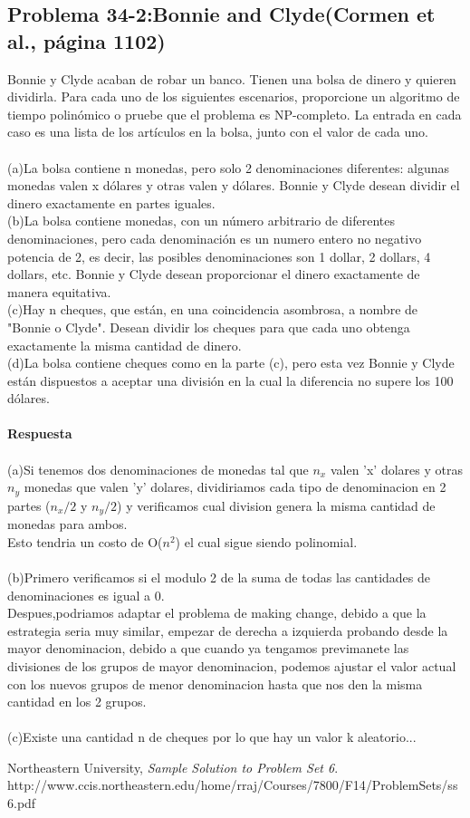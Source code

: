 \documentclass[a4paper,12pt]{article}
\begin{document}
\subsection{Problema 34-2:Bonnie and Clyde(Cormen et al., página 1102)}
Bonnie y Clyde acaban de robar un banco. Tienen una bolsa de dinero y quieren dividirla. Para cada uno de los siguientes escenarios, proporcione un algoritmo de tiempo polinómico o pruebe que el problema es NP-completo. La entrada en cada caso es una lista de los artículos en la bolsa, junto con el valor de cada uno.\\\\
(a)La bolsa contiene n monedas, pero solo 2 denominaciones diferentes: algunas monedas valen x dólares y otras valen y dólares. Bonnie y Clyde desean dividir el dinero exactamente en partes iguales.\\
(b)La bolsa contiene monedas, con un número arbitrario de diferentes denominaciones, pero cada denominación es un numero entero no negativo potencia de 2, es decir, las posibles denominaciones son 1 dollar, 2 dollars, 4 dollars, etc. Bonnie y Clyde desean proporcionar el dinero exactamente de manera equitativa.\\
(c)Hay n cheques, que están, en una coincidencia asombrosa, a nombre de "Bonnie o Clyde". Desean dividir los cheques para que cada uno obtenga exactamente la misma cantidad de dinero.\\
(d)La bolsa contiene cheques como en la parte (c), pero esta vez Bonnie y Clyde están dispuestos a aceptar una división en la cual la diferencia no supere los 100 dólares.\\\\
\textbf{Respuesta}\\\\
(a)Si tenemos dos denominaciones de monedas tal que $n_x$ valen 'x' dolares y otras $n_y$ monedas que valen 'y' dolares, dividiriamos cada tipo de denominacion en 2 partes ($n_x/2$ y $n_y/2$) y verificamos cual division genera la misma cantidad de monedas para ambos.\\
Esto tendria un costo de O($n^2$) el cual sigue siendo polinomial.
\cite{1}\\\\
(b)Primero verificamos si el modulo 2 de la suma de todas las cantidades de denominaciones es igual a 0.\\
Despues,podriamos adaptar el problema de making change, debido a que la estrategia seria muy similar, empezar de derecha a izquierda probando desde la mayor denominacion, debido a que cuando ya tengamos previmanete las divisiones de los grupos de mayor denominacion, podemos ajustar el valor actual con los nuevos grupos de menor denominacion hasta que nos den la misma cantidad en los 2 grupos.\\\\
(c)Existe una cantidad n de cheques por lo que hay un valor k aleatorio...

\begin{thebibliography}{15}

  Northeastern University,
  \emph{Sample Solution to Problem Set 6}.\\
  http://www.ccis.northeastern.edu/home/rraj/Courses/7800/F14/ProblemSets/ss6.pdf
  
\end{thebibliography}

\end{document}
